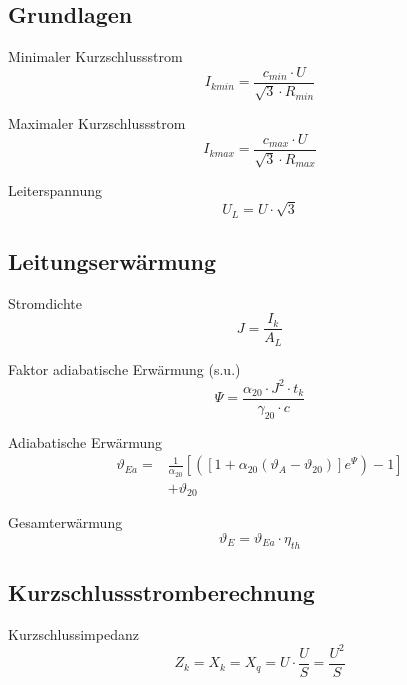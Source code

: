 \documentclass[11pt, a4paper, draft, fleqn, twocolumn]{article}
\numberwithin{equation}{subsection}
\begin{document}
\subsection{Grundlagen}

Minimaler Kurzschlussstrom
\begin{equation}
    I_{kmin} = \frac{c_{min} \cdot U}{\sqrt{3} \cdot R_{min}}
\end{equation}

\noindent Maximaler Kurzschlussstrom
\begin{equation}
    I_{kmax} = \frac{c_{max} \cdot U}{\sqrt{3} \cdot R_{max}}
\end{equation}

\noindent Leiterspannung
\begin{equation}
    U_L = U \cdot \sqrt{3}
\end{equation}


\subsection{Leitungserwärmung}

Stromdichte
\begin{equation}
    J = \frac{I_k}{A_L}
\end{equation}

\noindent Faktor adiabatische Erwärmung (s.u.)
\begin{equation}
    \Psi = \frac{\alpha_{20} \cdot J^2 \cdot t_k}{\gamma_{20} \cdot c}
\end{equation}

\noindent Adiabatische Erwärmung
\begin{equation}
\begin{split}
\vartheta_{Ea} = & \frac{1}{\alpha_{20}} \left[ \left( \left[ 1 + \alpha_{20}(\vartheta_{A} - \vartheta_{20}) \right] e^{\Psi} \right) -1 \right] \\
& + \vartheta_{20}
\end{split}
\end{equation}

\noindent Gesamterwärmung
\begin{equation}
    \vartheta_{E} = \vartheta_{Ea} \cdot \eta_{th}
\end{equation}


\subsection{Kurzschlussstromberechnung}

Kurzschlussimpedanz
\begin{equation}
    Z_k = X_k = X_q = U \cdot \frac{U}{S} = \frac{U^2 }{S}
\end{equation}
\end{document}
